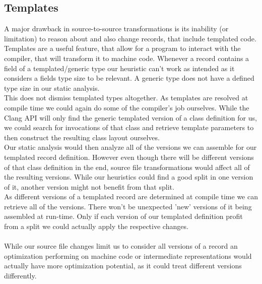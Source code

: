 \subsection{Templates}
A major drawback in source-to-source transformations is its inability (or limitation) to reason about and also change records, that include templated code. Templates are a useful feature, that allow for a program to interact with the compiler, that will transform it to machine code. Whenever a record contains a field of a templated/generic type our heuristic can't work as intended as it considers a fields type size to be relevant. A generic type does not have a defined type size in our static analysis.\\
This does not dismiss templated types altogether. As templates are resolved at compile time we could again do some of the compiler's job ourselves. While the Clang API will only find the generic templated version of a class definition for us, we could search for invocations of that class and retrieve template parameters to then construct the resulting class layout ourselves.\\
Our static analysis would then analyze all of the versions we can assemble for our templated record definition. However even though there will be different versions of that class definition in the end, source file transformations would affect all of the resulting versions. While our heuristics could find a good split in one version of it, another version might not benefit from that split.\\
As different versions of a templated record are determined at compile time we can retrieve all of the versions. There won't be unexpected 'new' versions of it being assembled at run-time. Only if each version of our templated definition profit from a split we could actually apply the respective changes.\\\\
While our source file changes limit us to consider all versions of a record an optimization performing on machine code or intermediate representations would actually have more optimization potential, as it could treat different versions differently.

